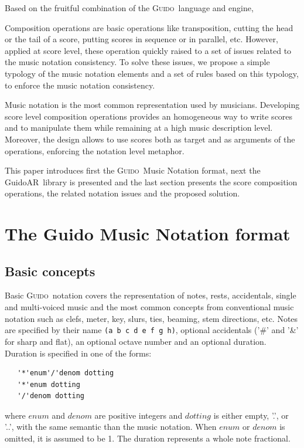 \documentclass[twoside,10pt,a4paper]{article}
\newenvironment{gmnsyntax}		{\vspace{-2mm}\small}{\vspace{-2mm}}
\newcommand{\Guido}	{\textsc{Guido}}
\newcommand{\GAR}		{GuidoAR}
\newcommand{\code}[1]	{{\small \texttt{#1}}}
\begin{document}
Based on the fruitful combination of the \Guido\ language and engine, 



Composition operations are basic operations like transposition, cutting the head or the tail of a score, putting scores in sequence or in parallel, etc. However, applied at score level, these operation quickly raised to a set of issues related to the music notation consistency. To solve these issues, we propose a simple typology of the music notation elements and a set of rules based on this typology, to enforce the music notation consistency.

Music notation is the most common representation used by musicians. Developing score level composition operations provides an homogeneous way to write scores and to manipulate them while remaining at a high music description level. Moreover, the design allows to use scores both as target and as arguments of the operations, enforcing the notation level metaphor.

This paper introduces first the \Guido\ Music Notation format, next the \GAR\ library is presented and the last section presents the score composition operations, the related notation issues and the proposed solution.

\section{The Guido Music Notation format}

\subsection{Basic concepts}
Basic \Guido\ notation covers the representation of notes, rests, accidentals, single and multi-voiced music and the most common concepts from conventional music notation such as clefs, meter, key, slurs, ties, beaming, stem directions, etc.
Notes are specified by their name \code{(a b c d e f g h)}, optional accidentals ('\#' and '\&' for sharp and flat), an optional octave number and an optional duration. \\
Duration is specified in one of the forms: 
\begin{gmnsyntax} 
\begin{verbatim} 
   '*'enum'/'denom dotting
   '*'enum dotting 
   '/'denom dotting
\end{verbatim}
\end{gmnsyntax} 
\noindent where $enum$ and $denom$ are positive integers and $dotting$ is either empty, '.', or '..', with the same semantic than the music notation. When $enum$ or $denom$ is omitted, it is assumed to be 1. The duration represents a whole note fractional.
\end{document}
